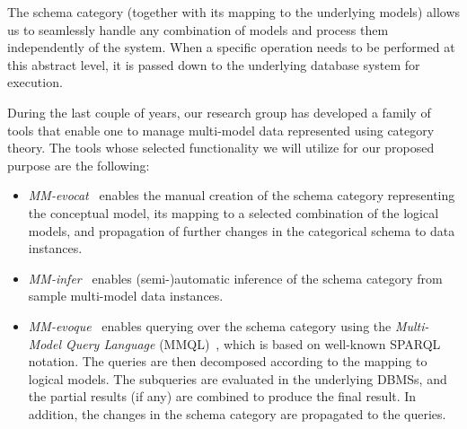 The schema category (together with its mapping to the underlying models) allows us to seamlessly handle any combination of models and process them independently of the system. When a specific operation needs to be performed at this abstract level, it is passed down to the underlying database system for execution.

During the last couple of years, our research group has developed a family of tools that enable one to manage multi-model data represented using category theory. The tools whose selected functionality we will utilize for our proposed purpose are the following:

\begin{itemize}
    \item \emph{MM-evocat}~\citep{cikm_2022} enables the manual creation of the schema category representing the conceptual model, its mapping to a selected combination of the logical models, and propagation of further changes in the categorical schema to data instances. 
    \item \emph{MM-infer}~\citep{mm_infer} enables (semi-)automatic inference of the schema category from sample multi-model data instances. %
   \item \emph{MM-evoque}~\citep{edbt_2024} enables querying over the schema category using the \textit{Multi-Model Query Language} (MMQL)~\citep{koupil2023universal}, which is based on well-known SPARQL~\citep{sparql} notation. The queries are then decomposed according to the mapping to logical models. The subqueries are evaluated in the underlying DBMSs, and the partial results (if any) are combined to produce the final result. In addition, the changes in the schema category are propagated to the queries.
\end{itemize}

